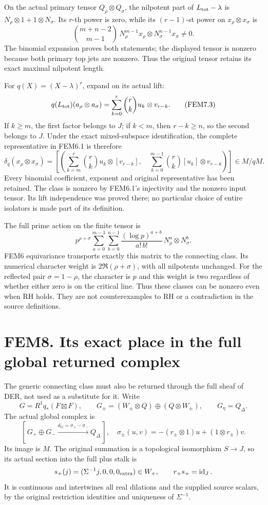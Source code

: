 On the actual primary tensor \(Q_\rho\otimes Q_\sigma\), the nilpotent
part of \(L_{\rm tot}-\lambda\) is \(N_\rho\otimes1+1\otimes N_\sigma\).
Its \(r\)-th power is zero, while its \((r-1)\)-st power on
\(x_\rho\otimes x_\sigma\) is \[
\binom{m+n-2}{m-1}\,
N_\rho^{m-1}x_\rho\otimes N_\sigma^{n-1}x_\sigma\ne0.
\tag{FEM7.2}
\] The binomial expansion proves both statements; the displayed tensor
is nonzero because both primary top jets are nonzero. Thus the original
tensor retains its exact maximal nilpotent length.

For \(q(X)=(X-\lambda)^r\), expand on its actual lift: \[
q(L_{\rm tot})(a_\rho\otimes a_\sigma)
=\sum_{k=0}^{r}\binom rk u_k\otimes v_{r-k}.
\tag{FEM7.3}
\] If \(k\geq m\), the first factor belongs to \(J\); if \(k<m\), then
\(r-k\geq n\), so the second belongs to \(J\). Under the exact
mixed-subspace identification, the complete representative in FEM6.1 is
therefore \[
\boxed{
\delta_q(x_\rho\otimes x_\sigma)=
\left[
\left(
 \sum_{k=m}^{r}\binom rk u_k\otimes[v_{r-k}],
 \quad
 \sum_{k=0}^{m-1}\binom rk [u_k]\otimes v_{r-k}
\right)
\right]\in M/qM.}
\tag{FEM7.4}
\] Every binomial coefficient, exponent and original representative has
been retained. The class is nonzero by FEM6.1's injectivity and the
nonzero input tensor. Its lift independence was proved there; no
particular choice of entire isolators is made part of its definition.

The full prime action on the finite tensor is \[
p^{\rho+\sigma}
 \sum_{a=0}^{m-1}\sum_{b=0}^{n-1}
 \frac{(\log p)^{a+b}}{a!\,b!}\,
 N_\rho^a\otimes N_\sigma^b.
\tag{FEM7.5}
\] FEM6 equivariance transports exactly this matrix to the connecting
class. Its numerical character weight is \(2\Re(\rho+\sigma)\), with all
nilpotents unchanged. For the reflected pair \(\sigma=1-\rho\), the
character is \(p\) and this weight is two regardless of whether either
zero is on the critical line. Thus these classes can be nonzero even
when RH holds. They are not counterexamples to RH or a contradiction in
the source definitions.

\section{FEM8. Its exact place in the full global returned
complex}\label{fem8.-its-exact-place-in-the-full-global-returned-complex}

The generic connecting class must also be returned through the full
sheaf of DER, not used as a substitute for it. Write \[
G=R^1q_*(F\boxtimes F),\qquad
G_\pm=(W_\pm\otimes Q)\oplus(Q\otimes W_\pm),\qquad
G_\eta=Q_\Delta.
\] The actual global complex is \[
[\,G_+\oplus G_-\xrightarrow{d_G=\sigma_+-\sigma_-}Q_\Delta\,],
\quad
\sigma_\pm(u,v)=-(r_\pm\otimes1)u+(1\otimes r_\pm)v.
\tag{FEM8.1}
\] Its image is \(M\). The original summation is a topological
isomorphism \(S\to J\), so its actual section into the full plus stalk
is \[
s_+(j)=(\Sigma^{-1}j,0,0,0_{\rm extra})\in W_+,\qquad r_+s_+=\operatorname{id}_J.
\] It is continuous and intertwines all real dilations and the supplied
source scalars, by the original restriction identities and uniqueness of
\(\Sigma^{-1}\).

